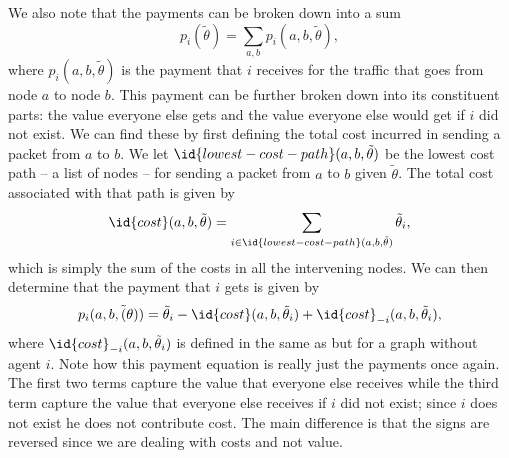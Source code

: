 We also note that the  payments can be broken down into a sum
\begin{equation}
  \label{eq:routing-sum}
  p_i(\tilde{\theta}) = \sum_{a,b} p_i(a,b,\tilde{\theta}), 
\end{equation}
where $p_i(a,b,\tilde{\theta})$ is the payment that $i$ receives for
the traffic that goes from node $a$ to node $b$. This payment can be
further broken down into its constituent  parts: the value
everyone else gets and the value everyone else would get if $i$ did
not exist.  We can find these by first defining the total cost
incurred in sending a packet from $a$ to $b$. We let
$\id{lowest-cost-path}(a,b,\tilde{\theta})$ be the lowest cost path --
a list of nodes -- for sending a packet from $a$ to $b$ given
$\tilde{\theta}$.  The total cost associated with that path is given
by
\begin{equation}
  \label{eq:cost}
\id{cost}(a,b,\tilde{\theta}) = \sum_{i \in
  \id{lowest-cost-path}(a,b,\tilde{\theta})} \tilde{\theta}_i,
\end{equation}
which is simply the sum of the costs in all the intervening nodes. We
can then determine that the payment that $i$ gets is given by
\begin{equation}
  \label{eq:pay1}
  p_i(a,b,\tilde(\theta)) = \tilde{\theta}_i -
  \id{cost}(a,b,\tilde{\theta}_i) + \id{cost}_{-i}(a,b,\tilde{\theta}_i),
\end{equation}
where $\id{cost}_{-i}(a,b,\tilde{\theta}_i)$ is defined in the same as
 but for a graph without agent $i$. Note how this payment
equation is really just the  payments once again. The first
two terms capture the value that everyone else receives while the
third term capture the value that everyone else receives if $i$ did
not exist; since $i$ does not exist he does not contribute cost. The
main difference is that the signs are reversed since we are dealing
with costs and not value.


